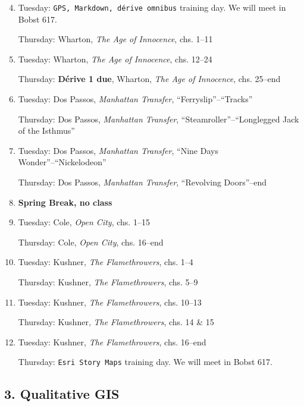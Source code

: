 \begin{enumerate}
 \setcounter{enumi}{3}
\item Tuesday: \texttt{GPS, Markdown, dérive omnibus} training day. We will meet in Bobst 617.

  Thursday: Wharton, \textit{The Age of Innocence}, chs. 1--11

  \item Tuesday: Wharton, \textit{The Age of Innocence},  chs. 12--24

    Thursday: \textbf{\small Dérive 1 due}, Wharton,  \textit{The Age of Innocence}, chs. 25--end
  
  \item Tuesday: Dos Passos, \textit{Manhattan Transfer}, “Ferryslip”--“Tracks”

    Thursday: Dos Passos,  \textit{Manhattan Transfer}, “Steamroller”--“Longlegged Jack of the Isthmus”

  \item Tuesday: Dos Passos,  \textit{Manhattan Transfer}, “Nine Days Wonder”--“Nickelodeon”

    Thursday: Dos Passos,  \textit{Manhattan Transfer}, “Revolving Doors”--end

  \item \textbf{Spring Break, no class}

  \item Tuesday: Cole, \textit{Open City}, chs. 1--15

    Thursday: Cole,  \textit{Open City}, chs. 16--end

  \item Tuesday: Kushner, \textit{The Flamethrowers}, chs. 1--4

    Thursday: Kushner, \textit{The Flamethrowers}, chs. 5--9

  \item Tuesday: Kushner, \textit{The Flamethrowers}, chs. 10--13 
  
    Thursday: Kushner, \textit{The Flamethrowers}, chs. 14 \& 15

  \item Tuesday: Kushner, \textit{The Flamethrowers}, chs. 16--end 

    Thursday: \texttt{Esri Story Maps} training day. We will meet in Bobst 617.

\end{enumerate}

\subsection{3. Qualitative GIS}

